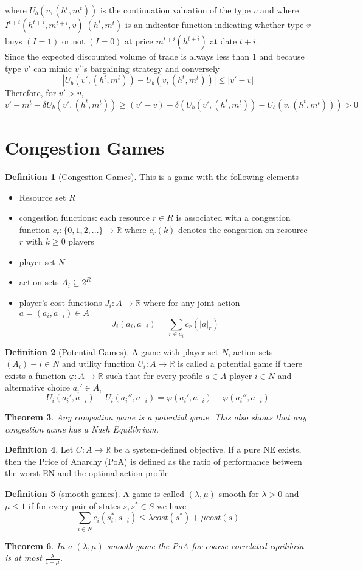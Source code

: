 \documentclass[a4paper, 12pt]{article}
\theoremstyle{plain}
\newtheorem{theorem}{Theorem}[subsection] %
\theoremstyle{definition}
\newtheorem{definition}[theorem]{Definition} %
\theoremstyle{lemma}
\theoremstyle{remark}
\theoremstyle{corollary}
\theoremstyle{example}
\begin{document}
	where $U_b(v,(h^t,m^t))$ is the continuation valuation of the type $v$ and where $I^{t+i}(h^{t+i},m^{t+i},v)|(h^t,m^t)$ is an indicator function indicating whether type $v$ buys $(I=1)$ or not $(I=0)$ at price $m^{t+i}(h^{t+i})$ at date $t+i$.\\
	Since the expected discounted volume of trade is always less than  1 and because type $v'$ can mimic $v'$'s bargaining strategy and conversely \[\left|U_b(v',(h^t,m^t)) - U_b(v,(h^t,m^t))\right| \leq \left|v'-v\right|\]
	Therefore, for $v'>v$, \[v'-m^t-\delta U_b(v',(h^t,m^t)) \geq (v'-v) - \delta(U_b(v',(h^t,m^t)) - U_b(v,(h^t,m^t))) > 0\]
	\section{Congestion Games}
	\begin{definition}[Congestion Games]
		This is a game with the following elements
		\begin{itemize}
			\item Resource set $R$
			\item congestion functions: each resource $r \in R$ is associated with a congestion function $c_r: \{0,1,2,...\} \to \mathbb{R}$ where $c_r(k)$ denotes the congestion on resource $r$ with $k \geq 0$ players
			\item player set $N$
			\item action sets $A_i \subseteq 2^R$
			\item player's cost functions $J_i: A \to \mathbb{R}$ where for any joint action $a = (a_i, a_{-i}) \in A$ \[J_i(a_i, a_{-i}) = \sum_{r \in a_i} c_r(\left|a\right|_r)\]
		\end{itemize}
	\end{definition}
	\begin{definition}[Potential Games]
		A game with player set $N$, action sets $(A_i)-{i \in N}$ and utility function $U_i: A \to \mathbb{R}$ is called a potential game if there exists a function $\varphi: A \to \mathbb{R}$ such that for every profile $a \in A$ player $i \in N$ and alternative choice $a_i' \in A_i$ \[U_i(a_i',a_{-i}) - U_i(a_i'',a_{-i}) = \varphi(a_i',a_{-i}) - \varphi(a_i'',a_{-i})\]
	\end{definition}
	\begin{theorem}
		Any congestion game is a potential game. This also shows that any congestion game has a Nash Equilibrium.
	\end{theorem}
	\begin{definition}
		Let $C:A \to \mathbb{R}$ be a system-defined objective. If a pure NE exists, then the Price of Anarchy (PoA) is defined as the ratio of performance between the worst EN and the optimal action profile.
	\end{definition}
	\begin{definition}[smooth games]
		A game is called $(\lambda,\mu)$-smooth for $\lambda > 0$ and $\mu \leq 1$ if for every pair of states $s,s^* \in S$ we have \[\sum_{i \in N} c_i(s_i^*,s_{-i}) \leq \lambda cost(s^*) + \mu cost(s)\]
	\end{definition}
	\begin{theorem}
		In a $(\lambda, \mu)$-smooth game the PoA for coarse correlated equilibria is at most $\frac{\lambda}{1-\mu}$.
	\end{theorem}
\end{document}
